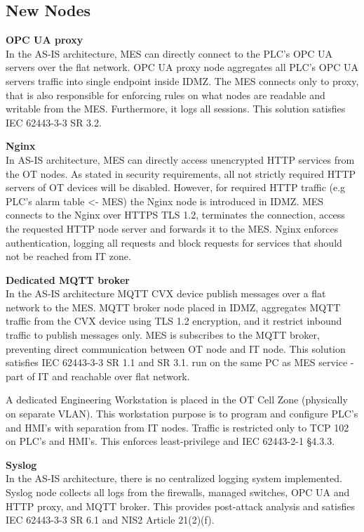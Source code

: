 \documentclass{report}
\begin{document}
\subsection{New Nodes} 
\textbf{OPC UA proxy} \\ In the AS-IS architecture, MES can directly connect to the PLC's OPC UA servers over the flat network. OPC UA proxy node aggregates all PLC's OPC UA servers traffic into single endpoint inside IDMZ. The MES connects only to proxy, that is also responsible for enforcing rules on what nodes are readable and writable from the MES. Furthermore, it logs all sessions. This solution satisfies IEC 62443-3-3 SR 3.2.

\textbf{Nginx} \\ In AS-IS architecture, MES can directly access unencrypted HTTP services from the OT nodes. As stated in security requirements, all not strictly required HTTP servers of OT devices will be disabled. However, for required HTTP traffic (e.g PLC's alarm table <- MES) the Nginx node is introduced in IDMZ. MES connects to the Nginx over HTTPS TLS 1.2, terminates the connection, access the requested HTTP node server and forwards it to the MES. Nginx enforces authentication, logging all requests and block requests for services that should not be reached from IT zone.

\textbf{Dedicated MQTT broker} \\ In the AS-IS architecture MQTT CVX device publish messages over a flat network to the MES. MQTT broker node placed in IDMZ, aggregates MQTT traffic from the CVX device using TLS 1.2 encryption, and it restrict inbound traffic to publish messages only. MES is subscribes to the MQTT broker, preventing direct communication between OT node and IT node. This solution satisfies IEC 62443-3-3 SR 1.1 and SR 3.1.
run on the same PC as MES service - part of IT and reachable over flat network. 

A dedicated Engineering Workstation is placed in the OT Cell Zone (physically on separate VLAN). This workstation purpose is to program and configure PLC's and HMI's with separation from IT nodes. Traffic is restricted only to TCP 102 on PLC's and HMI's. This enforces least-privilege and IEC 62443-2-1 §4.3.3.

\textbf{Syslog} \\ In the AS-IS architecture, there is no centralized logging system implemented. Syslog node collects all logs from the firewalls, managed switches, OPC UA and HTTP proxy, and MQTT broker. This provides post-attack analysis and satisfies IEC 62443-3-3 SR 6.1 and NIS2 Article 21(2)(f).
\end{document}

